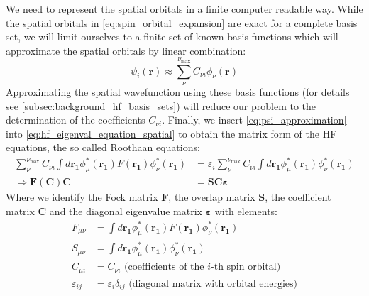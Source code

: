 We need to represent the spatial orbitals in a finite computer readable way. While the spatial orbitals in \autoref{eq:spin_orbital_expansion} are exact for a complete basis set, we will limit ourselves to a finite set of known basis functions which will approximate the spatial orbitals by linear combination:
\begin{equation}
    \label{eq:psi_approximation}
    \psi_i(\mathbf{r}) \approx \sum_{\nu}^{\nu_\text{max}} C_{\nu i} \phi_\nu(\mathbf{r})
\end{equation}
Approximating the spatial wavefunction using these basis functions (for details see \autoref{subsec:background_hf_basis_sets}) will reduce our problem to the determination of the coefficients $C_{\nu i}$. Finally, we insert \autoref{eq:psi_approximation} into \autoref{eq:hf_eigenval_equation_spatial} to obtain the matrix form of the HF equations, the so called Roothaan equations:
\begin{subequations}
    \label{eq:roothaan_equations}
    \begin{align}
        \sum_{\nu}^{\nu_\text{max}} C_{\nu i} \int d\mathbf{r_1} \phi_\mu^*(\mathbf{r_1}) F(\mathbf{r_1}) \phi_\nu^*(\mathbf{r_1})&= \varepsilon_i \sum_{\nu}^{\nu_\text{max}} C_{\nu i} \int d\mathbf{r_1} \phi_\mu^*(\mathbf{r_1})\phi_\nu^*(\mathbf{r_1}) \\
        \Rightarrow \mathbf{F(C)C} &= \mathbf{SC} \boldsymbol{\varepsilon} \label{eq:roothaan_equations_matrix}
    \end{align}
\end{subequations}
Where we identify the Fock matrix $\mathbf{F}$, the overlap matrix $\mathbf{S}$, the coefficient matrix $\mathbf{C}$ and the diagonal eigenvalue matrix $\boldsymbol{\varepsilon}$ with elements: 
\begin{subequations}
    \label{eq:roothaan_matrices}
    \begin{align}
        F_{\mu \nu} &= \int d\mathbf{r_1} \phi_\mu^*(\mathbf{r_1}) F(\mathbf{r_1}) \phi_\nu^*(\mathbf{r_1}) \label{eq:roothaan_mat_F}\\
        S_{\mu \nu} &= \int d\mathbf{r_1} \phi_\mu^*(\mathbf{r_1}) \phi_\nu^*(\mathbf{r_1}) \\
        C_{\mu i} &= C_{\nu i} \text{ (coefficients of the } i\text{-th spin orbital)}\\
        \varepsilon_{ij} &= \varepsilon_i \delta_{ij} \text{ (diagonal matrix with orbital energies)}
    \end{align}
\end{subequations}
